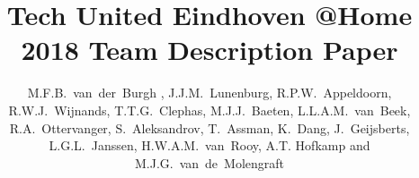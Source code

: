 \documentclass[runningheads,a4paper]{llncs}
\begin{document}
\setlength{\headheight}{22pt}

\title{Tech United Eindhoven @Home \\2018 Team Description Paper}

\author{M.F.B.~van~der~Burgh , J.J.M.~Lunenburg, R.P.W.~Appeldoorn, R.W.J.~Wijnands, 
T.T.G.~Clephas, M.J.J.~Baeten, L.L.A.M.~van~Beek, R.A.~Ottervanger, 
S.~Aleksandrov, T.~Assman, K.~Dang, J.~Geijsberts, L.G.L.~Janssen, 
H.W.A.M.~van~Rooy, A.T. Hofkamp and M.J.G.~van~de~Molengraft}



\end{document}
